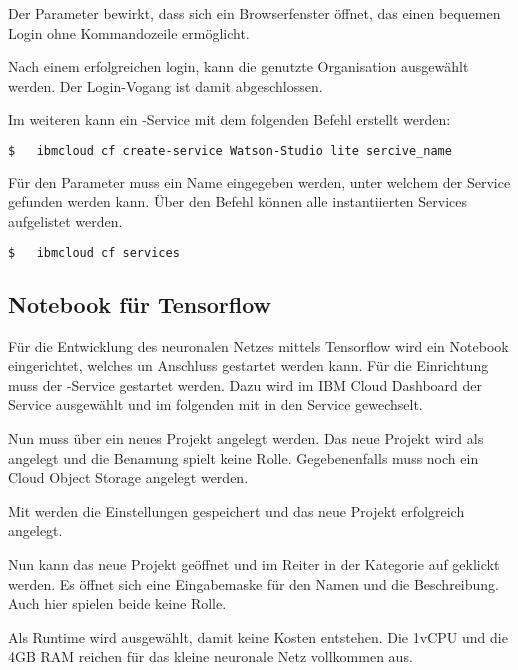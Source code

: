 Der Parameter  bewirkt, dass sich ein Browserfenster öffnet, das einen bequemen Login ohne Kommandozeile
ermöglicht.

Nach einem erfolgreichen login, kann die genutzte Organisation ausgewählt werden. Der Login-Vogang ist damit abgeschlossen.

Im weiteren kann ein -Service mit dem folgenden Befehl erstellt werden:

\begin{lstlisting}[language=bash, caption=Instanziierten des Watson Studio Services, label=Instanziierten des Watson Studio Services]
$   ibmcloud cf create-service Watson-Studio lite sercive_name
\end{lstlisting}

Für den Parameter  muss ein Name eingegeben werden, unter welchem der Service gefunden werden kann.
Über den Befehl  können alle instantiierten Services aufgelistet werden.

\begin{lstlisting}[language=bash, caption=Auflisten aller Services, label=Auflisten aller Services]
$   ibmcloud cf services
\end{lstlisting}

\subsection{Notebook für Tensorflow}
Für die Entwicklung des neuronalen Netzes mittels Tensorflow wird ein Notebook eingerichtet, welches un Anschluss gestartet
werden kann. Für die Einrichtung muss der -Service gestartet werden. Dazu wird im IBM Cloud Dashboard
der Service ausgewählt und im folgenden mit  in den Service gewechselt.

Nun muss über  ein neues Projekt angelegt werden. Das neue Projekt wird als  angelegt und
die Benamung spielt keine Rolle. Gegebenenfalls muss noch ein Cloud Object Storage angelegt werden.

Mit  werden die Einstellungen gespeichert und das neue Projekt erfolgreich angelegt.

Nun kann das neue Projekt geöffnet und im Reiter  in der Kategorie  auf 
geklickt werden. Es öffnet sich eine Eingabemaske für den Namen und die Beschreibung. Auch hier spielen beide keine Rolle.

Als Runtime wird  ausgewählt, damit keine Kosten entstehen. Die 1vCPU und die 4GB RAM
reichen für das kleine neuronale Netz vollkommen aus.

